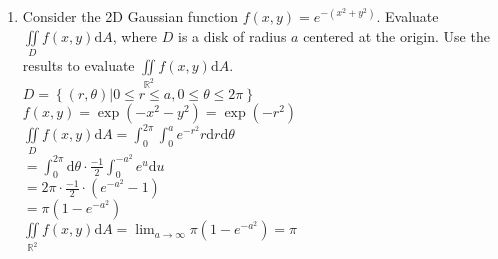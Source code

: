 \begin{enumerate}
	\item Consider the 2D Gaussian function $f(x,y)=e^{-(x^2+y^2)}$. Evaluate $\iint\limits_{D}{f(x,y)\mathrm{d}A}$, where $D$ is a disk of radius $a$ centered at the origin. Use the results to evaluate $\iint\limits_{\mathbb{R}^2}{f(x,y)\mathrm{d}A}$.\\
	\indent
	$D=\left\{(r,\theta)|0\leq r\leq a, 0\leq\theta\leq 2\pi\right\}$\\
	$f(x,y)=\exp{(-x^2-y^2)}=\exp{(-r^2)}$\\
	$\iint\limits_{D}{f(x,y)\mathrm{d}A}=\int_{0}^{2\pi}{\int_{0}^{a}{e^{-r^2}r\mathrm{d}r}\mathrm{d}\theta}$\\
	$=\int_{0}^{2\pi}{\mathrm{d}\theta}\cdot\frac{-1}{2}\int_{0}^{-a^2}{e^{u}\mathrm{d}u}$\\
	$=2\pi\cdot\frac{-1}{2}\cdot\left(e^{-a^2}-1\right)$\\
	$=\pi\left(1-e^{-a^2}\right)$\\
	$\iint\limits_{\mathbb{R}^2}{f(x,y)\mathrm{d}A}=\lim_{a\to\infty}{\pi\left(1-e^{-a^2}\right)}=\pi$\\
\end{enumerate}